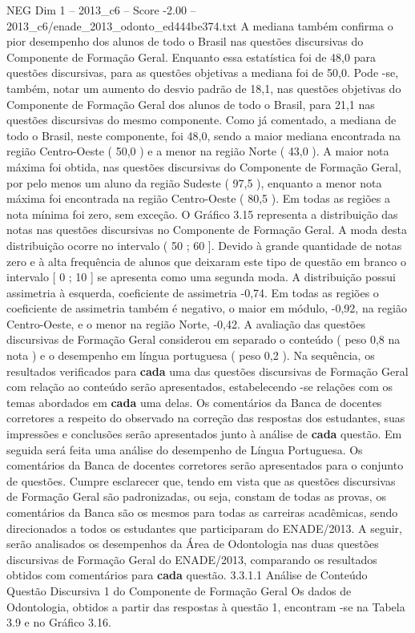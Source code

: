 \begin{textsample}{NEG Dim 1 – 2013\_c6 – Score -2.00 – 2013\_c6/enade\_2013\_odonto\_ed444be374.txt}
A mediana também confirma o pior desempenho dos alunos de todo o Brasil nas questões discursivas do Componente de Formação Geral.
Enquanto essa estatística foi de 48,0 para questões discursivas, para as questões objetivas a mediana foi de 50,0.
Pode -se, também, notar um aumento do desvio padrão de 18,1, nas questões objetivas do Componente de Formação Geral dos alunos de todo o Brasil, para 21,1 nas questões discursivas do mesmo componente.
Como já comentado, a mediana de todo o Brasil, neste componente, foi 48,0, sendo a maior mediana encontrada na região Centro-Oeste ( 50,0 ) e a menor na região Norte ( 43,0 ).
A maior nota máxima foi obtida, nas questões discursivas do Componente de Formação Geral, por pelo menos um aluno da região Sudeste ( 97,5 ), enquanto a menor nota máxima foi encontrada na região Centro-Oeste ( 80,5 ).
Em todas as regiões a nota mínima foi zero, sem exceção.
O Gráfico 3.15 representa a distribuição das notas nas questões discursivas no Componente de Formação Geral.
A moda desta distribuição ocorre no intervalo ( 50 ; 60 ].
Devido à grande quantidade de notas zero e à alta frequência de alunos que deixaram este tipo de questão em branco o intervalo [ 0 ; 10 ] se apresenta como uma segunda moda.
A distribuição possui assimetria à esquerda, coeficiente de assimetria -0,74.
Em todas as regiões o coeficiente de assimetria também é negativo, o maior em módulo, -0,92, na região Centro-Oeste, e o menor na região Norte, -0,42.
A avaliação das questões discursivas de Formação Geral considerou em separado o conteúdo ( peso 0,8 na nota ) e o desempenho em língua portuguesa ( peso 0,2 ).
Na sequência, os resultados verificados para \textbf{cada} uma das questões discursivas de Formação Geral com relação ao conteúdo serão apresentados, estabelecendo -se relações com os temas abordados em \textbf{cada} uma delas.
Os comentários da Banca de docentes corretores a respeito do observado na correção das respostas dos estudantes, suas impressões e conclusões serão apresentados junto à análise de \textbf{cada} questão.
Em seguida será feita uma análise do desempenho de Língua Portuguesa.
Os comentários da Banca de docentes corretores serão apresentados para o conjunto de questões.
Cumpre esclarecer que, tendo em vista que as questões discursivas de Formação Geral são padronizadas, ou seja, constam de todas as provas, os comentários da Banca são os mesmos para todas as carreiras acadêmicas, sendo direcionados a todos os estudantes que participaram do ENADE/2013.
A seguir, serão analisados os desempenhos da Área de Odontologia nas duas questões discursivas de Formação Geral do ENADE/2013, comparando os resultados obtidos com comentários para \textbf{cada} questão. 3.3.1.1 Análise de Conteúdo Questão Discursiva 1 do Componente de Formação Geral Os dados de Odontologia, obtidos a partir das respostas à questão 1, encontram -se na Tabela 3.9 e no Gráfico 3.16.

\end{textsample}
